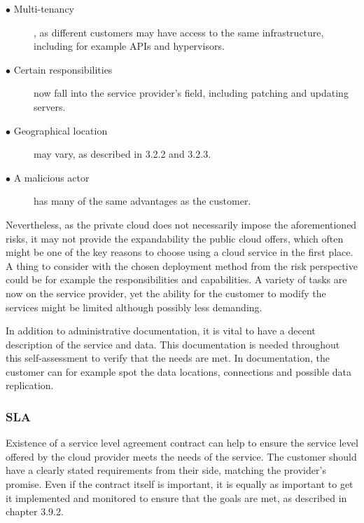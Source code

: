 \documentclass{article}
\begin{document}
\begin{description}
	\item[$\bullet$ Multi-tenancy], as different customers may have access to the same infrastructure, including for example APIs and hypervisors.
	\item[$\bullet$ Certain responsibilities] now fall into the service provider's field, including patching and updating servers.
	\item[$\bullet$ Geographical location] may vary, as described in 3.2.2 and 3.2.3.
	\item[$\bullet$ A malicious actor] has many of the same advantages as the customer.
\end{description}

Nevertheless, as the private cloud does not necessarily impose the aforementioned risks, it may not provide the expandability the public cloud offers, which often might be one of the key reasons to choose using a cloud service in the first place.
A thing to consider with the chosen deployment method from the risk perspective could be for example the responsibilities and capabilities. A variety of tasks are now on the service provider, yet the ability for the customer to modify the services might be limited although possibly less demanding.
\par
In addition to administrative documentation, it is vital to have a decent description of the service and data. This documentation is needed throughout this self-assessment to verify that the needs are met. In documentation, the customer can for example spot the data locations, connections and possible data replication.

\subsubsection{SLA}
Existence of a service level agreement contract can help to ensure the service level offered by the cloud provider meets the needs of the service. The customer should have a clearly stated requirements from their side, matching the provider's promise. Even if the contract itself is important, it is equally as important to get it implemented and monitored to ensure that the goals are met, as described in chapter 3.9.2.
\end{document}
